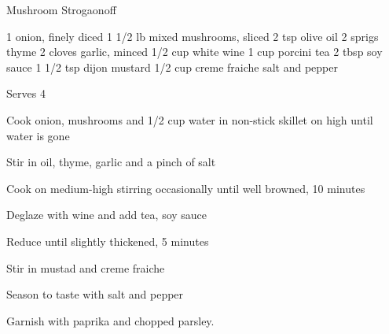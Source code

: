 \begin{denserecipe}{Mushroom Strogaonoff}{}
\begin{ingredients}
1 onion, finely diced
1 1/2 lb mixed mushrooms, sliced
2 tsp olive oil
2 sprigs thyme
2 cloves garlic, minced
1/2 cup white wine
1 cup porcini tea
2 tbsp soy sauce
1 1/2 tsp dijon mustard
1/2 cup creme fraiche
salt and pepper
\end{ingredients}
\nextcolumn
Serves 4
\begin{steps}
    \item Cook onion, mushrooms and 1/2 cup water in non-stick skillet on high until water is gone
    \item Stir in oil, thyme, garlic and a pinch of salt
    \item Cook on medium-high stirring occasionally until well browned, 10 minutes
    \item Deglaze with wine and add tea, soy sauce
    \item Reduce until slightly thickened, 5 minutes
    \item Stir in mustad and creme fraiche
    \item Season to taste with salt and pepper
\end{steps}
Garnish with paprika and chopped parsley.
\end{denserecipe}

